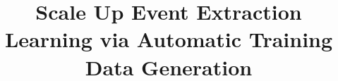 \documentclass[letterpaper]{article} %
\begin{document}
%
\title{Scale Up Event Extraction Learning via Automatic Training Data Generation}
\author{}
\maketitle












\end{document}
